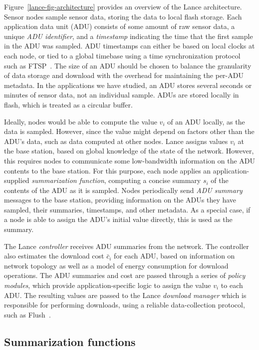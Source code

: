 Figure~\ref{lance-fig-architecture} provides an overview of the Lance
architecture. Sensor nodes sample sensor data, storing the
data to local flash storage. Each application data unit (ADU)
consists of
some amount of raw sensor data, a unique {\em ADU identifier}, and a 
{\em timestamp} indicating the time that the first sample in the ADU
was sampled. ADU timestamps can either be based on local clocks at
each node, or tied to a global timebase using a time synchronization
protocol such as FTSP~\cite{ftsp}. The size of an ADU should be
chosen to balance the granularity of data storage and download with
the overhead for maintaining the per-ADU metadata. In the applications
we have studied, an ADU stores several seconds or minutes 
of sensor data, not an individual sample. ADUs are stored
locally in flash, which is treated as a circular buffer.

Ideally, nodes would be able to compute the value $v_i$ of an ADU
locally, as the data is sampled. However, since the value might depend
on factors other than the ADU's data, such as data computed at
other nodes. Lance assigns values $v_i$ at the base station,
based on global knowledge of the state of the network. However, this
requires nodes to communicate some low-bandwidth information on the ADU
contents to the base station.  For this purpose, each node applies an
application-supplied {\em summarization function}, computing a 
concise summary $s_i$ of the contents of the ADU as it is sampled.
Nodes periodically send {\em ADU summary} messages to the
base station, providing information on the ADUs they have sampled,
their summaries, timestamps, and other metadata. As a special case,
if a node is able to assign the ADU's initial value directly, this is used
as the summary.

The Lance {\em controller} receives ADU summaries from the network.
The controller also estimates the download cost $\bar{c}_i$ for each
ADU, based on information on network topology as well as a model of
energy consumption for download operations. The ADU summaries and cost
are passed through a series of {\em policy modules}, which provide
application-specific logic to assign the value $v_i$ to each ADU.
The resulting values are passed to the Lance {\em download manager}
which is responsible for performing downloads, using a reliable
data-collection protocol, such as Flush~\cite{flush-sensys07}.

\subsection{Summarization functions}

